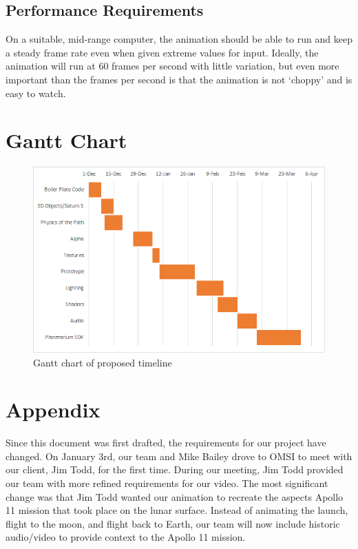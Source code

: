 \documentclass[onecolumn, draftclsnofoot,10pt, compsoc]{IEEEtran}
\begin{document}
    \subsection{Performance Requirements}
    On a suitable, mid-range computer, the animation should be able to run and keep a steady frame rate even when given extreme values for input. Ideally, the animation will run at 60 frames per second with little variation, but even more important than the frames per second is that the animation is not `choppy' and is easy to watch.

\section{Gantt Chart}

\begin{figure}[!htb]
    \includegraphics[width=\linewidth]{Gantt.PNG}
    \caption{Gantt chart of proposed timeline}
    \label{fig:Gantt Chart}
\end{figure}

\section{Appendix}
Since this document was first drafted, the requirements for our project have changed. On January 3rd, our team and Mike Bailey drove to OMSI to meet with our client, Jim Todd, for the first time. During our meeting, Jim Todd provided our team with more refined requirements for our video. The most significant change was that Jim Todd wanted our animation to recreate the aspects Apollo 11 mission that took place on the lunar surface. Instead of animating the launch, flight to the moon, and flight back to Earth, our team will now include historic audio/video to provide context to the Apollo 11 mission. 
\end{document}
